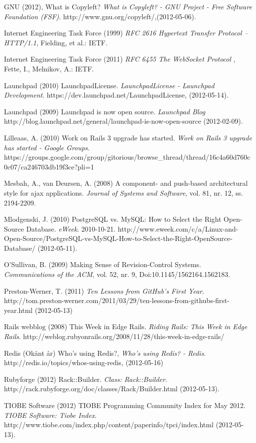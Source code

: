 \begin{flushleft}
GNU (2012), What is Copyleft? \emph{What is Copyleft? - GNU Project - Free Software Foundation (FSF)}. http://www.gnu.org/copyleft/,(2012-05-06).

Internet Engineering Task Force (1999) \emph{RFC 2616 Hypertext Transfer Protocol -- HTTP/1.1}, Fielding, et al.: IETF.

Internet Engineering Task Force (2011) \emph{RFC 6455 The WebSocket Protocol} , Fette, I., Melnikov, A.: IETF.

Launchpad (2010) LaunchpadLicense. \emph{LaunchpadLicense - Launchpad Development}. https://dev.launchpad.net/LaunchpadLicense, (2012-05-14).

Launchpad (2009) Launchpad is now open source. \emph{Launchpad Blog} http://blog.launchpad.net/general/launchpad-is-now-open-source (2012-02-09).

Lilleaas, A. (2010) Work on Rails 3 upgrade has started. \emph{Work on Rails 3 upgrade has started - Google Groups}. https://groups.google.com/group/gitorious/browse\_thread/thread/16c4a60d760c0c07/ca246703db19f3ce?pli=1

Mesbah, A., van Deursen, A. (2008) A component- and push-based architectural style for ajax applications. \emph{Journal of Systems and Software}, vol. 81, nr. 12, ss. 2194-2209.

Mlodgenski, J. (2010) PostgreSQL vs. MySQL: How to Select the Right Open-Source Database. \emph{eWeek}. 2010-10-21.  http://www.eweek.com/c/a/Linux-and-Open-Source/PostgreSQL-vs-MySQL-How-to-Select-the-Right-OpenSource-Database/ (2012-05-11).

O'Sullivan, B. (2009) Making Sense of Revision-Control Systems. \emph{Communications of the ACM}, vol. 52, nr. 9, Doi:10.1145/1562164.1562183.

Preston-Werner, T. (2011) \emph{Ten Lessons from GitHub's First Year}. http://tom.preston-werner.com/2011/03/29/ten-lessons-from-githubs-first-year.html (2012-05-13)

Rails webblog (2008) This Week in Edge Rails. \emph{Riding Rails: This Week in Edge Rails}. http://weblog.rubyonrails.org/2008/11/28/this-week-in-edge-rails/

Redis (Okänt år) Who's using Redis?, \emph{Who's using Redis? - Redis}. http://redis.io/topics/whos-using-redis, (2012-05-16) 

Rubyforge (2012) Rack::Builder. \emph{Class: Rack::Builder}. http://rack.rubyforge.org/doc/classes/Rack/Builder.html (2012-05-13).

TIOBE Software (2012) TIOBE Programming Community Index for May 2012. \emph{TIOBE Software: Tiobe Index}. http://www.tiobe.com/index.php/content/paperinfo/tpci/index.html (2012-05-13).


\end{flushleft}
